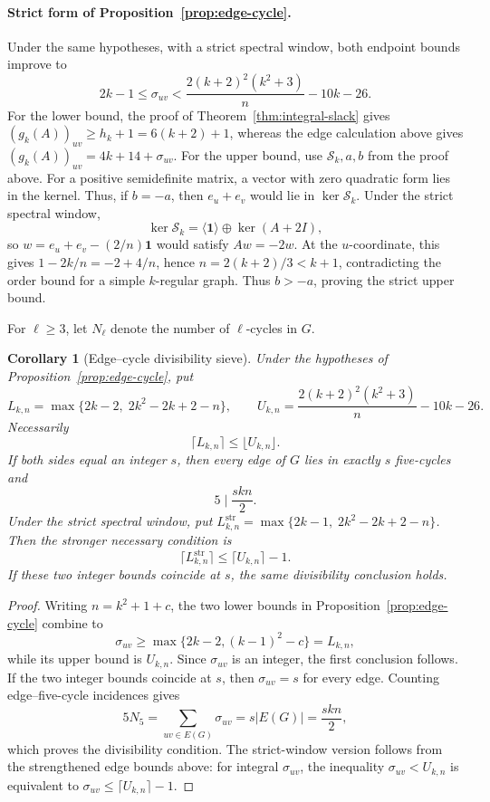\documentclass[a4paper,10pt,reqno]{amsart}
\theoremstyle{plain}
\newtheorem{corollary}[theorem]{Corollary}
\theoremstyle{definition}
\theoremstyle{remark}
\newcommand{\one}{\mathbf 1}
\newcommand{\resultbox}[1]{\boxed{#1}}
\begin{document}
\paragraph{Strict form of Proposition~\ref{prop:edge-cycle}.}
Under the same hypotheses, with a strict spectral window, both endpoint
bounds improve to
\[
 2k-1\le\sigma_{uv}
 <\frac{2(k+2)^2(k^2+3)}n-10k-26.
\]
For the lower bound, the proof of
Theorem~\ref{thm:integral-slack} gives
\((g_k(A))_{uv}\ge h_k+1=6(k+2)+1\), whereas the edge calculation above
gives \((g_k(A))_{uv}=4k+14+\sigma_{uv}\).
For the upper bound, use \(\mathcal S_k,a,b\) from the proof above. For a
positive semidefinite matrix, a vector with zero quadratic form lies in the
kernel. Thus, if \(b=-a\), then \(e_u+e_v\) would lie in \(\ker\mathcal S_k\).
Under the strict spectral window,
\[
 \ker\mathcal S_k=\langle\one\rangle\oplus\ker(A+2I),
\]
so \(w=e_u+e_v-(2/n)\one\) would satisfy \(Aw=-2w\).
At the \(u\)-coordinate, this gives
\(1-2k/n=-2+4/n\), hence \(n=2(k+2)/3<k+1\), contradicting
the order bound for a simple \(k\)-regular graph. Thus \(b>-a\), proving
the strict upper bound.

For \(\ell\ge3\), let \(N_\ell\) denote the number of
\(\ell\)-cycles in \(G\).

\begin{corollary}[Edge--cycle divisibility sieve]
\label{cor:edge-cycle-sieve}
Under the hypotheses of Proposition~\ref{prop:edge-cycle}, put
\[
 L_{k,n}=\max\{2k-2,\;2k^2-2k+2-n\},
 \qquad
 U_{k,n}=\frac{2(k+2)^2(k^2+3)}{n}-10k-26.
\]
Necessarily
\[
 \resultbox{\lceil L_{k,n}\rceil\le\lfloor U_{k,n}\rfloor.}
\]
If both sides equal an integer \(s\), then every edge of \(G\) lies in
exactly \(s\) five-cycles and
\[
 \resultbox{5\mid \frac{skn}{2}.}
\]
Under the strict spectral window, put
\(L^{\mathrm{str}}_{k,n}=\max\{2k-1,\;2k^2-2k+2-n\}\).
Then the stronger necessary condition is
\[
 \lceil L^{\mathrm{str}}_{k,n}\rceil
 \le\lceil U_{k,n}\rceil-1.
\]
If these two integer bounds coincide at \(s\), the same divisibility
conclusion holds.
\end{corollary}

\begin{proof}
Writing \(n=k^2+1+c\), the two lower bounds in
Proposition~\ref{prop:edge-cycle} combine to
\[
 \sigma_{uv}\ge
 \max\{2k-2,(k-1)^2-c\}=L_{k,n},
\]
while its upper bound is \(U_{k,n}\).  Since \(\sigma_{uv}\) is an integer,
the first conclusion follows.  If the two integer bounds coincide at \(s\),
then \(\sigma_{uv}=s\) for every edge.  Counting edge--five-cycle incidences
gives
\[
 5N_5=\sum_{uv\in E(G)}\sigma_{uv}
 =s|E(G)|=\frac{skn}{2},
\]
which proves the divisibility condition.
The strict-window version follows from the strengthened edge bounds above:
for integral \(\sigma_{uv}\), the inequality \(\sigma_{uv}<U_{k,n}\) is
equivalent to \(\sigma_{uv}\le\lceil U_{k,n}\rceil-1\).
\end{proof}
\end{document}
